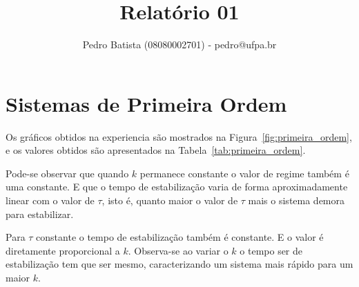 \documentclass[a4paper]{article}
\title{Relatório 01}
\author{Pedro Batista (08080002701) - pedro@ufpa.br}
\begin{document}
\maketitle

\section{Sistemas de Primeira Ordem}
   Os gráficos obtidos na experiencia são mostrados na Figura~\ref{fig:primeira_ordem},
e os valores obtidos são apresentados na Tabela~\ref{tab:primeira_ordem}.

   Pode-se observar que quando $k$ permanece constante o valor de regime também é uma constante.
E que o tempo de estabilização varia de forma aproximadamente linear com o valor de $\tau$, 
isto é, quanto maior o valor de $\tau$ mais o sistema demora para estabilizar.

   Para $\tau$ constante o tempo de estabilização também é constante. E o valor
é diretamente proporcional a $k$. Observa-se ao variar o $k$ o tempo ser
de estabilização tem que ser mesmo, caracterizando um sistema mais rápido para um
maior $k$.
\end{document}
